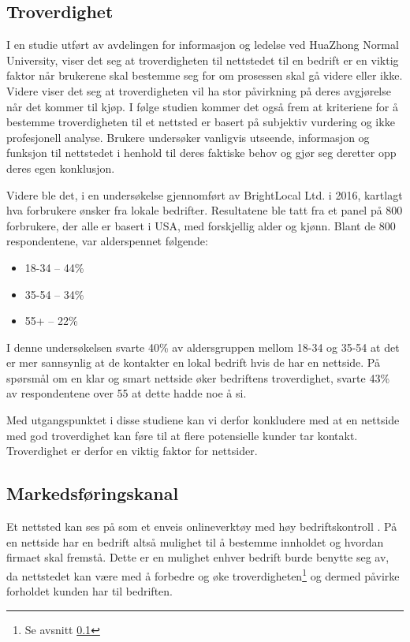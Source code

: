 \subsection{Troverdighet}
\label{sec:analyse-troverdighet}
I en studie \cite{zhao2009eew} utført av avdelingen for informasjon og ledelse ved HuaZhong Normal University, viser det seg at troverdigheten til nettstedet til en bedrift er en viktig faktor når brukerene skal bestemme seg for om prosessen skal gå videre eller ikke. Videre viser det seg at troverdigheten vil ha stor påvirkning på deres avgjørelse når det kommer til kjøp. I følge studien kommer det også frem at kriteriene for å bestemme troverdigheten til et nettsted er basert på subjektiv vurdering og ikke profesjonell analyse. Brukere undersøker vanligvis utseende, informasjon og funksjon til nettstedet i henhold til deres faktiske behov og gjør seg deretter opp deres egen konklusjon.


Videre ble det, i en undersøkelse \cite{marchant18wdc} gjennomført av BrightLocal Ltd. i 2016, kartlagt hva forbrukere ønsker fra lokale bedrifter. Resultatene ble tatt fra et panel på 800 forbrukere, der alle er basert i USA, med forskjellig alder og kjønn. Blant de 800 respondentene, var alderspennet følgende: 

\begin{itemize}
\item 18-34 – 44\%
\item 35-54 – 34\%
\item 55+ – 22\%
\end{itemize}

I denne undersøkelsen svarte 40\% av aldersgruppen mellom 18-34 og 35-54 at det er mer sannsynlig at de kontakter en lokal bedrift hvis de har en nettside. På spørsmål om en klar og smart nettside øker bedriftens troverdighet, svarte 43\% av respondentene over 55 at dette hadde noe å si.

Med utgangspunktet i disse studiene kan vi derfor konkludere med at en nettside med god troverdighet kan føre til at flere potensielle kunder tar kontakt. Troverdighet er derfor en viktig faktor for nettsider.

\subsection{Markedsføringskanal}
Et nettsted kan ses på som et enveis onlineverktøy med høy bedriftskontroll \cite{taiminen2015tuo}. På en nettside har en bedrift altså mulighet til å bestemme innholdet og hvordan firmaet skal fremstå. Dette er en mulighet enhver bedrift burde benytte seg av, da nettstedet kan være med å forbedre og øke troverdigheten\footnote{Se avsnitt \ref{sec:analyse-troverdighet}} og dermed påvirke forholdet kunden har til bedriften.

